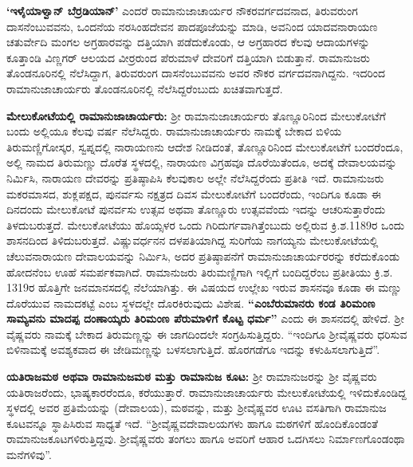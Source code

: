\textbf{‘ಇಳೈಯಾಳ್ವಾನ್​ ಬೆರ್ರಡಿಯಾನ್​’} ಎಂದರೆ ರಾಮಾನುಜಾಚಾರ್ಯರ ನೌಕರವರ್ಗದವನಾದ, ತಿರುವರುಂಗ ದಾಸನೆಂಬುವವನು, ಒಂದನೆಯ ನರಸಿಂಹದೇವನ ಪಾದಪೂಜೆಯನ್ನು ಮಾಡಿ, ಅವನಿಂದ ಯಾದವನಾರಾಯಣ ಚತುರ್ವೇದಿ ಮಂಗಲ ಅಗ್ರಹಾರವನ್ನು ದತ್ತಿಯಾಗಿ ಪಡೆದುಕೊಂಡು, ಆ ಅಗ್ರಹಾರದ ಕೆಲವು ಆದಾಯಗಳನ್ನು ಕೂತ್ತಾಂಡಿ ವಿಣ್ಣಗರ್​ ಆಲಯದ ವೀರ್ರರುಂದ ಪೆರುಮಾಳೆ ದೇವರಿಗೆ ದತ್ತಿಯಾಗಿ ಬಿಡುತ್ತಾನೆ. ರಾಮಾನುಜರು ತೊಂಡನೂರಿನಲ್ಲಿ ನೆಲೆಸಿದ್ದಾಗ, ತಿರುವರುಂಗ ದಾಸನೆಂಬುವವನು ಅವರ ನೌಕರ ವರ್ಗದವನಾಗಿದ್ದನು. ಇದರಿಂದ ರಾಮಾನುಜಾಚಾರ್ಯರು ತೊಂಡನೂರಿನಲ್ಲಿ ನೆಲೆಸಿದ್ದರೆಂಬುದು ಖಚಿತವಾಗುತ್ತದೆ. 

\textbf{ಮೇಲುಕೋಟೆಯಲ್ಲಿ ರಾಮಾನುಜಾಚಾರ್ಯರು:} ಶ‍್ರೀ ರಾಮಾನುಜಾಚಾರ್ಯರು ತೊಣ್ಣೂರಿನಿಂದ ಮೇಲುಕೋಟೆಗೆ ಬಂದು ಅಲ್ಲಿಯೂ ಕೆಲವು ವರ್ಷ ನೆಲೆಸಿದ್ದರು. ರಾಮಾನುಜಾಚಾರ್ಯರು ನಾಮಕ್ಕೆ ಬೇಕಾದ ಬಿಳಿಯ ತಿರುಮಣ್ಣಿಗೋಸ್ಕರ, ಸ್ವಪ್ನದಲ್ಲಿ ನಾರಾಯಣನು ಆದೇಶ ನೀಡಿದಂತೆ, ತೊಣ್ಣೂರಿನಿಂದ ಮೇಲುಕೋಟೆಗೆ ಬಂದರೆಂದೂ, ಅಲ್ಲಿ ನಾಮದ ತಿರುಮಣ್ಣು ದೊರೆತ ಸ್ಥಳದಲ್ಲಿ, ನಾರಾಯಣ ವಿಗ್ರಹವೂ ದೊರೆಯಿತೆಂದೂ, ಅದಕ್ಕೆ ದೇವಾಲಯವನ್ನು ನಿರ್ಮಿಸಿ, ನಾರಾಯಣ ದೇವರನ್ನು ಪ್ರತಿಷ್ಠಾಪಿಸಿ ಕೆಲವುಕಾಲ ಅಲ್ಲೇ ನೆಲೆಸಿದ್ದರೆಂದು ಪ್ರತೀತಿ ಇದೆ. ರಾಮಾನುಜರು ಮಕರಮಾಸದ, ಶುಕ್ಲಪಕ್ಷದ, ಪುನರ್ವಸು ನಕ್ಷತ್ರದ ದಿವಸ ಮೇಲುಕೋಟೆಗೆ ಬಂದರೆಂದು, ಇಂದಿಗೂ ಕೂಡಾ ಈ ದಿನದಂದು ಮೇಲುಕೋಟೆ ಪುನರ್ವಸು ಉತ್ಸವ ಅಥವಾ ತೊಣ್ಣೂರು ಉತ್ಸವವೆಂದು ಇದನ್ನು ಆಚರಿಸುತ್ತಾರೆಂದು ತಿಳದುಬರುತ್ತದೆ. ಮೇಲುಕೋಟೆಯು ಹೊಯ್ಸಳರ ಒಂದು ಗಿರಿದುರ್ಗವಾಗಿತ್ತೆಂಬುದು ಅಲ್ಲಿರುವ ಕ್ರಿ.ಶ.1189ರ ಒಂದು ಶಾಸನದಿಂದ ತಿಳಿದುಬರುತ್ತದೆ. ವಿಷ್ಣುವರ್ಧನನ ದಳಪತಿಯಾಗಿದ್ದ ಸುರಿಗೆಯ ನಾಗಯ್ಯನು ಮೇಲುಕೋಟೆಯಲ್ಲಿ ಚೆಲುವನಾರಾಯಣ ದೇವಾಲಯವನ್ನು ನಿರ್ಮಿಸಿ, ಅದರ ಪ್ರತಿಷ್ಠಾಪನೆಗೆ ರಾಮಾನುಜಾಚಾರ್ಯರರನ್ನು ಕರೆದುಕೊಂಡು ಹೋದನೆಂಬ ಊಹೆ ಸಮರ್ಪಕವಾಗಿದೆ. ರಾಮಾನುಜರು ತಿರುಮಣ್ಣಿಗಾಗಿ ಇಲ್ಲಿಗೆ ಬಂದಿದ್ದರೆಂಬ ಪ್ರತೀತಿಯು ಕ್ರಿ.ಶ. 1319ರ ಹೊತ್ತಿಗೇ ಜನಮಾನಸದಲ್ಲಿ ನೆಲೆಯಾಗಿತ್ತು. ಈ ವಿಷಯದ ಉಲ್ಲೇಖ ಇರುವ ಶಾಸನವೂ ಕೂಡಾ ಈ ಮಣ್ಣು ದೊರೆಯುವ ನಾಮದಕಟ್ಟೆ ಎಂಬ ಸ್ಥಳದಲ್ಲೇ ದೊರಕಿರುವುದು ವಿಶೇಷ. \textbf{“ಎಂಬೆರುಮಾನರು ಕಂಡ ತಿರಿಮಂಣ ಸಾಮ್ಯವನು ಮಾದಪ್ಪ ದಂಣಾಯ್ಕರು ತಿರಿಮಂಣ ಪೆರುಮಾಳಿಗೆ ಕೊಟ್ಟ ಧರ್ಮ”} ಎಂದು ಈ ಶಾಸನದಲ್ಲಿ ಹೇಳಿದೆ. ಶ‍್ರೀ ವೈಷ್ಣವರು ನಾಮಕ್ಕೆ ಬೇಕಾದ ತಿರುಮಣ್ಣನ್ನು ಈ ಜಾಗದಿಂದಲೇ ಸಂಗ್ರಹಿಸುತ್ತಿದ್ದರು. “ಇಂದಿಗೂ ಶ‍್ರೀವೈಷ್ಣವರು ಧರಿಸುವ ಬಿಳಿನಾಮಕ್ಕೆ ಅವಶ್ಯಕವಾದ ಈ ಜೇಡಿಮಣ್ಣನ್ನು ಬಳಸಲಾಗುತ್ತಿದೆ. ಹೊರಗಡೆಗೂ ಇದನ್ನು ಕಳುಹಿಸಲಾಗುತ್ತಿದೆ”.

\textbf{ಯತಿರಾಜಮಠ ಅಥವಾ ರಾಮಾನುಜಮಠ ಮತ್ತು ರಾಮಾನುಜ ಕೂಟ:} ಶ‍್ರೀ ರಾಮಾನುಜರನ್ನು ಶ‍್ರೀ ವೈಷ್ಣವರು ಯತಿರಾಜರೆಂದು, ಭಾಷ್ಯಕಾರರೆಂದೂ, ಕರೆಯುತ್ತಾರೆ. ರಾಮಾನುಜಾಚಾರ್ಯರು ಮೇಲುಕೋಟೆಯಲ್ಲಿ ಇಳಿದುಕೊಂಡಿದ್ದ ಸ್ಥಳದಲ್ಲಿ ಅವರ ಪ್ರತಿಮೆಯನ್ನು (ದೇವಾಲಯ), ಮಠವನ್ನು, ಮತ್ತು ಶ‍್ರೀವೈಷ್ಣವರ ಊಟ ವಸತಿಗಾಗಿ ರಾಮಾನುಜ ಕೂಟವನ್ನೂ ಸ್ಥಾಪಿಸಿರುವ ಸಾಧ್ಯತೆ ಇದೆ. “ಶ‍್ರೀವೈಷ್ಣವದೇವಾಲಯಗಳು ಹಾಗೂ ಮಠಗಳಿಗೆ ಹೊಂದಿಕೊಂಡಂತೆ ರಾಮಾನುಜಕೂಟಗಳಿರುತ್ತಿದ್ದವು. ಶ‍್ರೀವೈಷ್ಣವರು ತಂಗಲು ಹಾಗೂ ಅವರಿಗೆ ಆಹಾರ ಒದಗಿಸಲು ನಿರ್ಮಾಣಗೊಂಡಂಥಾ ಮನೆಗಳಿವು”.

